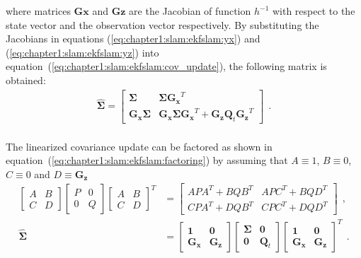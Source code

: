where matrices $\bm{Gx}$ and $\bm{Gz}$ are the Jacobian of function $h^{-1}$ with respect to the state vector and the observation vector respectively. By substituting the Jacobians in equations (\ref{eq:chapter1:slam:ekfslam:yx}) and (\ref{eq:chapter1:slam:ekfslam:yz}) into equation~(\ref{eq:chapter1:slam:ekfslam:cov_update}), the following matrix is obtained:
\begin{align}
    \hat{\bm{\Sigma}} = \begin{bmatrix}
        \bm{\Sigma} & \bm{\Sigma} \bm{G_x}^T \\
        \bm{G_x} \bm{\Sigma} & \bm{G_x} \bm{\Sigma} \bm{G_x}^T + \bm{G_z} \bm{Q}_t \bm{G_z}^T
    \end{bmatrix}~~.
    \label{eq:chapter1:slam:ekfslam:cov_update_full}
\end{align}\\

The linearized covariance update can be factored as shown in equation~(\ref{eq:chapter1:slam:ekfslam:factoring}) by assuming that $A \equiv 1$, $B \equiv 0$, $C \equiv 0$ and $D \equiv \bm{G_z}$
\begin{align}
    \begin{bmatrix}
        A & B \\ C & D
    \end{bmatrix} \begin{bmatrix}
        P & 0 \\ 0 & Q
    \end{bmatrix} \begin{bmatrix}
        A & B \\ C & D
    \end{bmatrix}^T &= \begin{bmatrix}
            APA^T + BQB^T & APC^T + BQD^T \\
            CPA^T + DQB^T & CPC^T + DQD^T
    \end{bmatrix}~~,
    \label{eq:chapter1:slam:ekfslam:factoring}\\
    \hat{\bm{\Sigma}} &= \begin{bmatrix}
        \bm{1} & \bm{0} \\ \bm{G_x} & \bm{G_z}
    \end{bmatrix} \begin{bmatrix}
        \bm{\Sigma} & \bm{0} \\ \bm{0} & \bm{Q}_t
    \end{bmatrix} \begin{bmatrix}
        \bm{1} & \bm{0} \\ \bm{G_x} & \bm{G_z}
    \end{bmatrix}^T~~.
    \label{eq:chapter1:slam:ekfslam:factored_cov_update}
\end{align}

